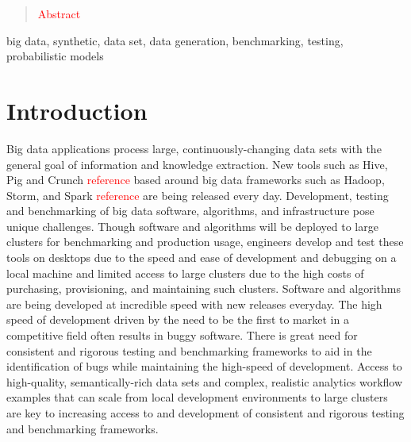 \documentclass[conference]{IEEEtran}
\begin{document}
\begin{abstract}
\textcolor{red}{Abstract}

\end{abstract}


\begin{IEEEkeywords}
big data, synthetic, data set, data generation, benchmarking, testing, probabilistic models
\end{IEEEkeywords}




%
\IEEEpeerreviewmaketitle



\section{Introduction}
Big data applications process large, continuously-changing data sets with the general goal of information and knowledge extraction.  New tools such as Hive, Pig and Crunch \textcolor{red}{reference} based around big data frameworks such as Hadoop, Storm, and Spark \textcolor{red}{reference} are being released every day. Development, testing and benchmarking of big data software, algorithms, and infrastructure pose unique challenges.  Though software and algorithms will be deployed to large clusters for benchmarking and production usage, engineers develop and test these tools on desktops due to the speed and ease of development and debugging on a local machine and limited access to large clusters due to the high costs of purchasing, provisioning, and maintaining such clusters.  Software and algorithms are being developed at incredible speed with new releases everyday. The high speed of development driven by the need to be the first to market in a competitive field often results in buggy software.  There is great need for consistent and rigorous testing and benchmarking frameworks to aid in the identification of bugs while maintaining the high-speed of development.  Access to high-quality, semantically-rich data sets and complex, realistic analytics workflow examples that can scale from local development environments to large clusters are key to increasing access to and development of consistent and rigorous testing and benchmarking frameworks.
\end{document}
